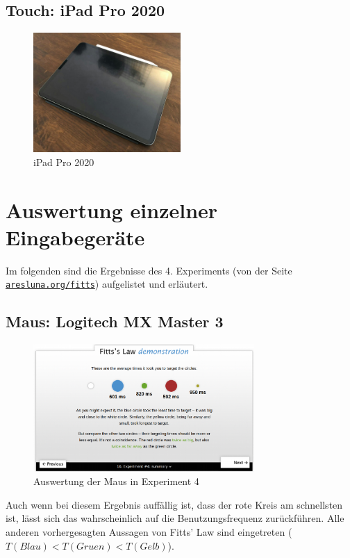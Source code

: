 \documentclass{article}
\begin{document}
\subsection{Touch: iPad Pro 2020}

\begin{figure}[h!]
	\centering
	\includegraphics[width=0.5\textwidth]{ipad}
	\caption{iPad Pro 2020}
\end{figure}

\section{Auswertung einzelner Eingabegeräte}

Im folgenden sind die Ergebnisse des 4. Experiments (von der Seite
\href{https://www.aresluna.org/fitts}{\texttt{aresluna.org/fitts}}) aufgelistet
und erläutert.

\subsection{Maus: Logitech MX Master 3}

\begin{figure}[h!]
	\centering
	\includegraphics[width=0.75\textwidth]{experiment-4-maus}
	\caption{Auswertung der Maus in Experiment 4}
\end{figure}

Auch wenn bei diesem Ergebnis auffällig ist, dass der rote Kreis am schnellsten
ist, lässt sich das wahrscheinlich auf die Benutzungsfrequenz zurückführen.
Alle anderen vorhergesagten Aussagen von Fitts' Law sind eingetreten ($T(Blau) <
T(Gruen) < T(Gelb)$).
\end{document}
